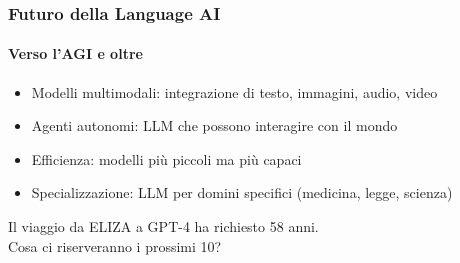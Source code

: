 \begin{frame}[t,fragile] \frametitle{Futuro della Language AI}
	{\small
		\onslide<1->
		\framesubtitle{Verso l'AGI e oltre}
		\begin{itemize}[leftmargin=10pt,align=right]
			\onslide<2->\item[\alert{\faHandORight}] \alert{Modelli multimodali:} integrazione di testo, immagini, audio, video
			\onslide<3->\item[\alert{\faHandORight}] \alert{Agenti autonomi:} LLM che possono interagire con il mondo
			\onslide<4->\item[\alert{\faHandORight}] \alert{Efficienza:} modelli più piccoli ma più capaci
			\onslide<5->\item[\alert{\faHandORight}] \alert{Specializzazione:} LLM per domini specifici (medicina, legge, scienza)
		\end{itemize}
		\vspace*{.5cm}
		\begin{center}
			\alert{\Large Il viaggio da ELIZA a GPT-4 ha richiesto 58 anni.\\
			Cosa ci riserveranno i prossimi 10?}
		\end{center}
	}
\end{frame}
%
